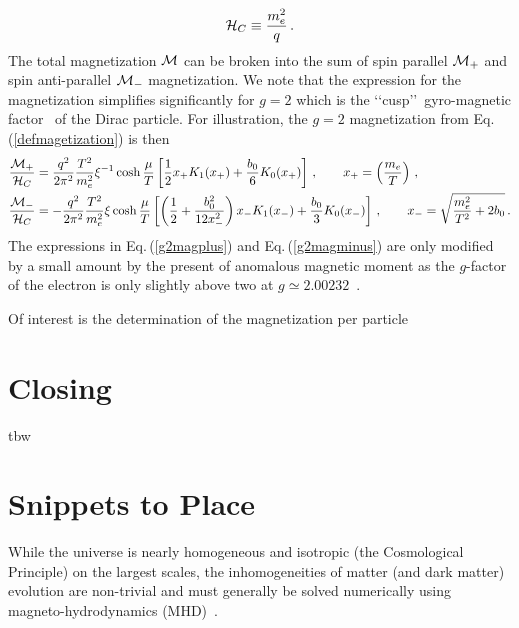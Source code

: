 \documentclass[a4paper]{article}
\newcommand{\req}[1]{Eq.\,(\ref{#1})}
\begin{document}
\begin{align}
    {\cal H}_{C}\equiv\frac{m_{e}^{2}}{q}\,.
\end{align}
The total magnetization ${\cal M}$ can be broken into the sum of spin parallel ${\cal M}_{+}$ and spin anti-parallel ${\cal M}_{-}$ magnetization. We note that the expression for the magnetization simplifies significantly for $g=2$ which is the \lq\lq cusp\rq\rq\ gyro-magnetic factor~\cite{rafelski2022study} of the Dirac particle. For illustration, the $g=2$ magnetization from \req{defmagetization} is then
\begin{align}
    \label{g2magplus}
    \frac{{\cal M}_{+}}{{\cal H}_{C}}&=\frac{q^{2}}{2\pi^{2}}\frac{T^{2}}{m_{e}^{2}}\xi^{-1}\cosh{\frac{\mu}{T}}\left[\frac{1}{2}x_{+}K_{1}(x_{+})+\frac{b_{0}}{6}K_{0}(x_{+})\right]\,,\qquad x_{+}=\left(\frac{m_{e}}{T}\right)\,,\\
    \label{g2magminus}
    \frac{{\cal M}_{-}}{{\cal H}_{C}}&=-\frac{q^{2}}{2\pi^{2}}\frac{T^{2}}{m_{e}^{2}}\xi\cosh{\frac{\mu}{T}}\left[\left(\frac{1}{2}+\frac{b_{0}^{2}}{12x_{-}^{2}}\right)x_{-}K_{1}(x_{-})+\frac{b_{0}}{3}K_{0}(x_{-})\right]\,,\qquad x_{-}=\sqrt{\frac{m_{e}^{2}}{T^{2}}+2b_{0}}\,.
\end{align}
The expressions in \req{g2magplus} and \req{g2magminus} are only modified by a small amount by the present of anomalous magnetic moment as the $g$-factor of the electron is only slightly above two at $g\simeq2.00232$~\cite{tiesinga2021codata}.
 
Of interest is the determination of the magnetization per particle

\section{Closing}
\label{sec:conclusions}
\noindent tbw
\section{Snippets to Place}
While the universe is nearly homogeneous and isotropic (the Cosmological Principle) on the largest scales, the inhomogeneities of matter (and dark matter) evolution are non-trivial and must generally be solved numerically using magneto-hydrodynamics (MHD)~\cite{melrose2008quantum,vazza2017simulations}.



\end{document}
